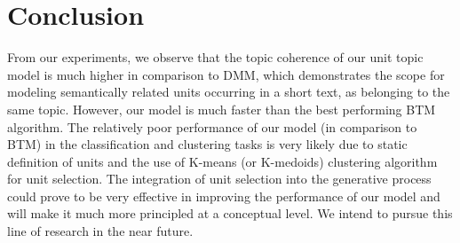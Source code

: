 \documentclass{sig-alternate-05-2015}
\begin{document}
\section{Conclusion}
From our experiments, we observe that the topic coherence of our unit topic model is much higher in comparison to DMM, which demonstrates the scope for modeling semantically related units occurring in a short text, as belonging to the same topic. 
However, our model is much faster than the best performing BTM algorithm. 
The relatively poor performance of our model (in comparison to BTM) in the classification and clustering tasks is very likely due to static definition of units and the use of K-means (or K-medoids) clustering algorithm for unit selection. The integration of unit selection into the generative process could prove to be very effective in improving the performance of our model and will make it much more principled at a conceptual level. We intend to pursue this line of research in the near future.   
%

%
%




\end{document}
